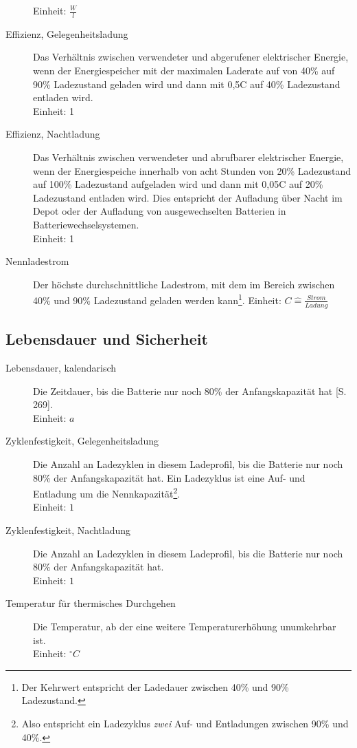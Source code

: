 \documentclass{scrartcl}
\begin{document}
\begin{description}
	Einheit: $\frac{W}{l}$
	\item[Effizienz, Gelegenheitsladung] Das Verhältnis zwischen verwendeter und abgerufener elektrischer Energie, wenn der Energiespeicher mit der maximalen Laderate auf von 40\% auf 90\% Ladezustand geladen wird und dann mit 0,5C auf 40\% Ladezustand entladen wird.\\
	Einheit: 1
	\item[Effizienz, Nachtladung] Das Verhältnis zwischen verwendeter und abrufbarer elektrischer Energie, wenn der Energiespeiche innerhalb von acht Stunden von 20\% Ladezustand auf 100\% Ladezustand aufgeladen wird und dann mit 0,05C auf 20\% Ladezustand entladen wird. Dies entspricht der Aufladung über Nacht im Depot oder der Aufladung von ausgewechselten Batterien in Batteriewechselsystemen.\\
	Einheit: 1
	\item[Nennladestrom] Der höchste durchschnittliche Ladestrom, mit dem im Bereich zwischen 40\% und 90\% Ladezustand geladen werden kann\footnote{Der Kehrwert entspricht der Ladedauer zwischen 40\% und 90\% Ladezustand.}.
	Einheit: $C\hat{=} \frac{Strom}{Ladung}$
\end{description}

\subsection{Lebensdauer und Sicherheit}
\begin{description}
	\item[Lebensdauer, kalendarisch] Die Zeitdauer, bis die Batterie nur noch 80\% der Anfangskapazität hat \cite{Sterner:2014}[S. 269]. \\
	Einheit: $a$
	\item[Zyklenfestigkeit, Gelegenheitsladung] Die Anzahl an Ladezyklen in diesem Ladeprofil, bis die Batterie nur noch 80\% der Anfangskapazität hat. Ein Ladezyklus ist eine Auf- und Entladung um die Nennkapazität\footnote{Also entspricht ein Ladezyklus \emph{zwei} Auf- und Entladungen zwischen 90\% und 40\%.}.\\
	Einheit: $1$
	\item[Zyklenfestigkeit, Nachtladung] Die Anzahl an Ladezyklen in diesem Ladeprofil, bis die Batterie nur noch 80\% der Anfangskapazität hat.\\
	Einheit: $1$
	\item[Temperatur für thermisches Durchgehen] Die Temperatur, ab der eine weitere Temperaturerhöhung unumkehrbar ist.\\
	Einheit: $^\circ C$
\end{description}




\end{document}
